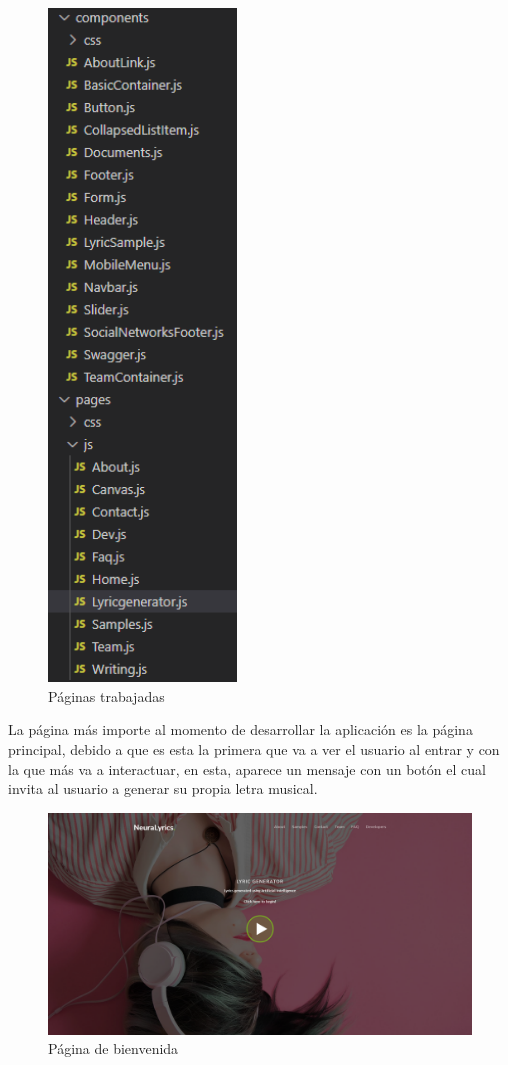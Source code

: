 \documentclass[12pt, a4paper, titlepage]{report}
\begin{document}
\begin{figure}[H]
	\includegraphics[width=5cm]{./imagenes/Desarrollo/AplicacionWeb/Paginas.png}
	\centering 
	\caption{Páginas trabajadas}
\end{figure}
La página más importe al momento de desarrollar la aplicación es la página principal, debido a que es esta la primera que va a ver el usuario al entrar y con la que más va a interactuar, en esta, aparece un mensaje con un botón el cual invita al usuario a generar su propia letra musical.
\begin{figure}[H]
	\includegraphics[width=13.5cm]{./imagenes/Desarrollo/AplicacionWeb/Pbienvenida.png}
	\centering 
	\caption{Página de bienvenida}
\end{figure}
\end{document}
